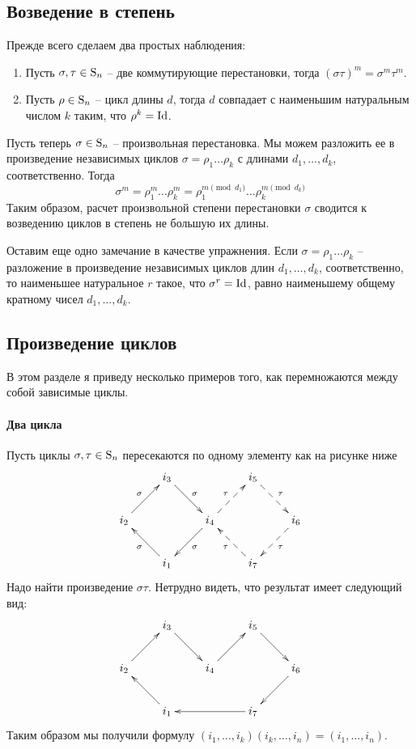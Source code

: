 \subsection{Возведение в степень}

Прежде всего сделаем два простых наблюдения:
\begin{enumerate}
\item Пусть $\sigma, \tau\in \operatorname{S}_{n}$ -- две коммутирующие перестановки, тогда $(\sigma \tau)^m = \sigma^m \tau^m$.

\item Пусть $\rho \in\operatorname{S}_{n}$ -- цикл длины $d$, тогда $d$ совпадает с наименьшим натуральным числом $k$ таким, что $\rho^k = \operatorname{Id}$.
\end{enumerate}

Пусть теперь $\sigma\in\operatorname{S}_{n}$ -- произвольная перестановка.
Мы можем разложить ее в произведение независимых циклов $\sigma = \rho_1 \ldots \rho_k$ с длинами $d_1, \ldots, d_k$, соответственно.
Тогда 
\[
\sigma^m = \rho_1^m \ldots \rho_k^m = \rho_1^{m\pmod{d_1}}\ldots \rho_k^{m \pmod{d_k}}
\]
Таким образом, расчет произвольной степени перестановки $\sigma$ сводится к возведению циклов в степень не большую их длины.

Оставим еще одно замечание в качестве упражнения.
Если $\sigma = \rho_1\ldots \rho_k$ -- разложение в произведение независимых циклов длин $d_1,\ldots,d_k$, соответственно, то наименьшее натуральное $r$ такое, что $\sigma^r = \operatorname{Id}$, равно наименьшему общему кратному чисел $d_1,\ldots,d_k$.


\subsection{Произведение циклов}

В этом разделе я приведу несколько примеров того, как перемножаются между собой зависимые циклы.

\paragraph{Два цикла}

Пусть циклы $\sigma,\tau\in \operatorname{S}_{n}$ пересекаются по одному элементу как на рисунке ниже
\[
\xymatrix{
	{}&{i_3}\ar[dr]^{\sigma}&{}&{i_5}\ar@{-->}[dr]^{\tau}&{}\\
	{i_2}\ar[ur]^{\sigma}&{}&{i_4}\ar[dl]^{\sigma}\ar@{-->}[ur]^{\tau}&{}&{i_6}\ar@{-->}[dl]^{\tau}\\
	{}&{i_1}\ar[ul]^{\sigma}&{}&{i_7}\ar@{-->}[ul]^{\tau}&{}\\
}
\]
Надо найти произведение $\sigma\tau$.
Нетрудно видеть, что результат имеет следующий вид:
\[
\xymatrix{
	{}&{i_3}\ar[dr]&{}&{i_5}\ar[dr]&{}\\
	{i_2}\ar[ur]&{}&{i_4}
	\ar[ur]&{}&{i_6}\ar[dl]\\
	{}&{i_1}\ar[ul]&{}&{i_7}\ar[ll]&{}\\
}
\]
Таким образом мы получили формулу $(i_1,\ldots,i_k)(i_k,\ldots,i_n) = (i_1,\ldots,i_n)$.

